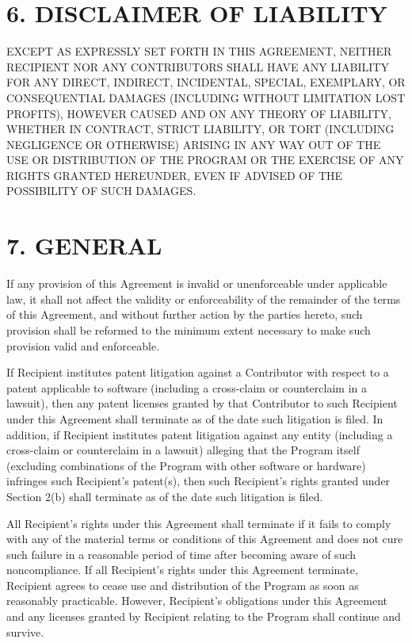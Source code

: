 \section*{6. DISCLAIMER OF LIABILITY}

EXCEPT AS EXPRESSLY SET FORTH IN THIS AGREEMENT, NEITHER RECIPIENT NOR ANY 
CONTRIBUTORS SHALL HAVE ANY LIABILITY FOR ANY DIRECT, INDIRECT, INCIDENTAL, 
SPECIAL, EXEMPLARY, OR CONSEQUENTIAL DAMAGES (INCLUDING WITHOUT LIMITATION LOST 
PROFITS), HOWEVER CAUSED AND ON ANY THEORY OF LIABILITY, WHETHER IN CONTRACT, 
STRICT LIABILITY, OR TORT (INCLUDING NEGLIGENCE OR OTHERWISE) ARISING IN ANY 
WAY OUT OF THE USE OR DISTRIBUTION OF THE PROGRAM OR THE EXERCISE OF ANY RIGHTS 
GRANTED HEREUNDER, EVEN IF ADVISED OF THE POSSIBILITY OF SUCH DAMAGES.


\section*{7. GENERAL}

If any provision of this Agreement is invalid or unenforceable under applicable 
law, it shall not affect the validity or enforceability of the remainder of the 
terms of this Agreement, and without further action by the parties hereto, such 
provision shall be reformed to the minimum extent necessary to make such 
provision valid and enforceable.

If Recipient institutes patent litigation against a Contributor with respect to 
a patent applicable to software (including a cross-claim or counterclaim in a 
lawsuit), then any patent licenses granted by that Contributor to such 
Recipient under this Agreement shall terminate as of the date such litigation 
is filed. In addition, if Recipient institutes patent litigation against any 
entity (including a cross-claim or counterclaim in a lawsuit) alleging that the 
Program itself (excluding combinations of the Program with other software or 
hardware) infringes such Recipient's patent(s), then such Recipient's rights 
granted under Section 2(b) shall terminate as of the date such litigation is 
filed.

All Recipient's rights under this Agreement shall terminate if it fails to 
comply with any of the material terms or conditions of this Agreement and does 
not cure such failure in a reasonable period of time after becoming aware of 
such noncompliance. If all Recipient's rights under this Agreement terminate, 
Recipient agrees to cease use and distribution of the Program as soon as 
reasonably practicable. However, Recipient's obligations under this Agreement 
and any licenses granted by Recipient relating to the Program shall continue 
and survive.

